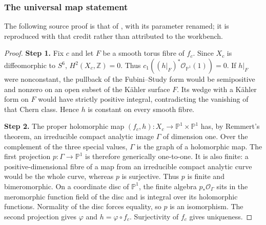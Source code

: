 \documentclass[11pt,a4paper]{article}
\theoremstyle{plain}
\theoremstyle{definition}
\begin{document}
\subsubsection{The universal map statement}
The following source proof is that of \cite[Theorem 7.2]{DGKXv1}, with its parameter renamed; it is reproduced with that credit rather than attributed to the workbench.
\begin{proof}
\par\smallskip\noindent\textbf{Step 1.} Fix $c$ and let $F$ be a smooth torus fibre of $f_c$. Since $X_c$ is
diffeomorphic to $S^6$, $H^2(X_c,\mathbb Z)=0$. Thus
$c_1((h|_F)^*\mathcal O_{\mathbb P^1}(1))=0$. If $h|_F$ were nonconstant, the
pullback of the Fubini--Study form would be semipositive and nonzero
on an open subset of the K\"ahler surface $F$. Its wedge with a
K\"ahler form on $F$ would have strictly positive integral,
contradicting the vanishing of that Chern class. Hence $h$ is
constant on every smooth fibre.

\par\smallskip\noindent\textbf{Step 2.} The proper holomorphic map $(f_c,h):X_c\to\mathbb P^1\times\mathbb P^1$ has,
by Remmert's theorem, an irreducible compact analytic image $\Gamma$
of dimension one. Over the complement of the three special values,
$\Gamma$ is the graph of a holomorphic map. The first projection
$p:\Gamma\to\mathbb P^1$ is therefore generically one-to-one. It is also
finite: a positive-dimensional fibre of a map from an irreducible
compact analytic curve would be the whole curve, whereas $p$ is
surjective. Thus $p$ is finite and bimeromorphic. On a coordinate
disc of $\mathbb P^1$, the finite algebra $p_*\mathcal O_\Gamma$ sits in the
meromorphic function field of the disc and is integral over its
holomorphic functions. Normality of the disc forces equality, so
$p$ is an isomorphism. The second projection gives $\varphi$ and
$h=\varphi\circ f_c$. Surjectivity of $f_c$ gives uniqueness.
\end{proof}
\end{document}

